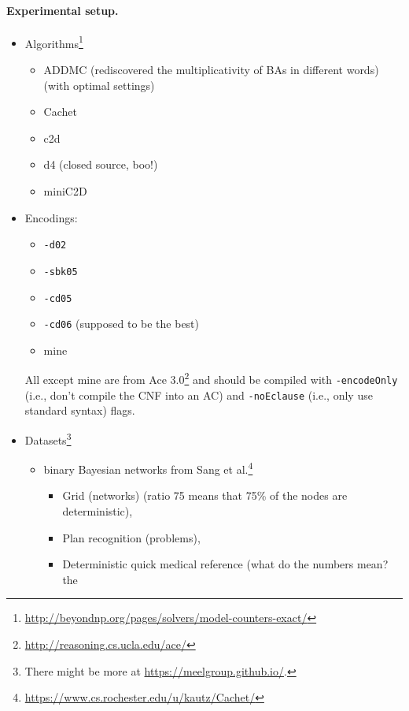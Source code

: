 \documentclass{article}
\theoremstyle{definition}
\theoremstyle{remark}
\begin{document}
\paragraph{Experimental setup.}
\begin{itemize}
\item
  Algorithms\footnote{\url{http://beyondnp.org/pages/solvers/model-counters-exact/}}
  \begin{itemize}
  \item ADDMC \cite{DBLP:conf/aaai/DudekPV20} (rediscovered the
    multiplicativity of BAs in different words) (with optimal settings)
  \item Cachet \cite{DBLP:conf/sat/SangBBKP04}
  \item c2d \cite{DBLP:conf/ecai/Darwiche04}
  \item d4 \cite{DBLP:conf/ijcai/LagniezM17} (closed source, boo!)
  \item miniC2D  \cite{DBLP:conf/ijcai/OztokD15}
  \end{itemize}
\item Encodings:
  \begin{itemize}
  \item \texttt{-d02} \cite{DBLP:conf/kr/Darwiche02}
  \item \texttt{-sbk05} \cite{DBLP:conf/aaai/SangBK05}
  \item \texttt{-cd05} \cite{DBLP:conf/ijcai/ChaviraD05}
  \item \texttt{-cd06} \cite{DBLP:conf/sat/ChaviraD06} (supposed to be the best)
  \item mine
  \end{itemize}
  All except mine are from Ace
  3.0\footnote{\url{http://reasoning.cs.ucla.edu/ace/}} and should be compiled
  with \texttt{-encodeOnly} (i.e., don't compile the CNF into an AC) and
  \texttt{-noEclause} (i.e., only use standard syntax) flags.
\item Datasets\footnote{There might be more at
    \url{https://meelgroup.github.io/}.}
  \begin{itemize}
  \item binary Bayesian networks from Sang et
    al.\footnote{\url{https://www.cs.rochester.edu/u/kautz/Cachet/}}
    \cite{DBLP:conf/aaai/SangBK05}
    \begin{itemize}
    \item Grid (networks) (ratio 75 means that 75\% of the nodes are
      deterministic),
    \item Plan recognition (problems),
    \item Deterministic quick medical reference (what do the numbers mean? the

\end{itemize}
\end{itemize}
\end{itemize}
\end{document}
